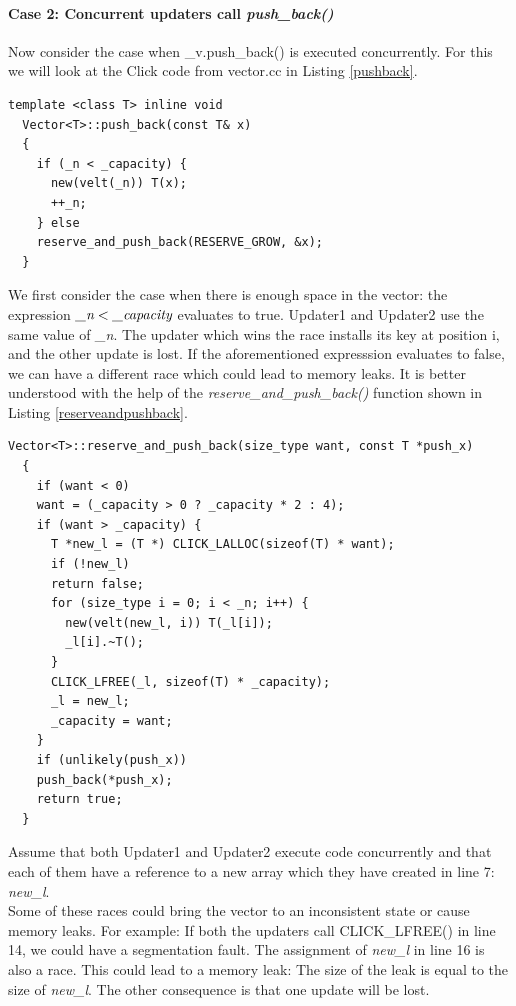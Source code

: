 \documentclass{article}
\begin{document}
\paragraph{Case 2: Concurrent updaters call \emph{push\_back()}}
Now consider the case when \_v.push\_back() is executed concurrently. For this we will look at the Click code from vector.cc in Listing \ref{pushback}.
\begin{lstlisting}[caption = The push\_back function, label=pushback]
  template <class T> inline void
  Vector<T>::push_back(const T& x)
  {
    if (_n < _capacity) {
      new(velt(_n)) T(x);
      ++_n;
    } else
    reserve_and_push_back(RESERVE_GROW, &x);
  }
\end{lstlisting}
We first consider the case when there is enough space in the vector: the expression $\emph{\_n} < \emph{\_capacity}$ evaluates to true. Updater1 and Updater2 use the same value of \emph{\_n}. The updater which wins the race installs its key at position i, and the other update is lost. If the aforementioned expresssion evaluates to false, we can have a different race which could lead to memory leaks. It is better understood with the help of the \emph{reserve\_and\_push\_back()} function shown in Listing \ref{reserveandpushback}.
\begin{lstlisting}[caption= reserve\_and\_push\_back(), label =reserveandpushback]
  Vector<T>::reserve_and_push_back(size_type want, const T *push_x)
  {
    if (want < 0)
    want = (_capacity > 0 ? _capacity * 2 : 4);
    if (want > _capacity) {
      T *new_l = (T *) CLICK_LALLOC(sizeof(T) * want);
      if (!new_l)
      return false;
      for (size_type i = 0; i < _n; i++) {
        new(velt(new_l, i)) T(_l[i]);
        _l[i].~T();
      }
      CLICK_LFREE(_l, sizeof(T) * _capacity);
      _l = new_l;
      _capacity = want;
    }
    if (unlikely(push_x))
    push_back(*push_x);
    return true;
  }
\end{lstlisting}
Assume that both Updater1 and Updater2 execute code concurrently and that each of them have a reference to a new array which they have created in line 7: \emph{new\_l}.
\\Some of these races could bring the vector to an inconsistent state or cause memory leaks. For example: If both the updaters call CLICK\_LFREE() in line 14, we could have a segmentation fault. The assignment of \emph{new\_l} in line 16 is also a race. This could lead to a memory leak: The size of the leak is equal to the size of \emph{new\_l}. The other consequence is that one update will be lost.
\end{document}
